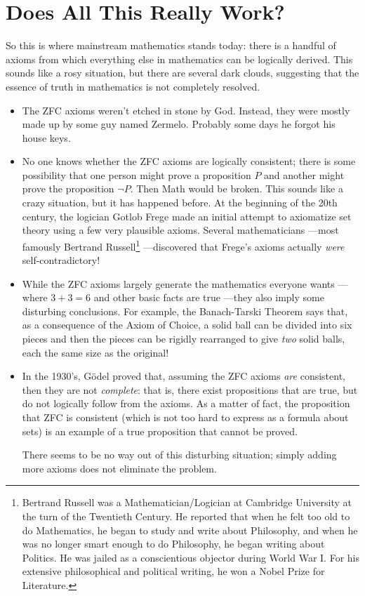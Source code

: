 \section{Does All This Really Work?}

So this is where mainstream mathematics stands today: there is a handful of
axioms from which everything else in mathematics can be logically derived.
This sounds like a rosy situation, but there are several dark clouds,
suggesting that the essence of truth in mathematics is not completely
resolved.
%
\begin{itemize}

\item The ZFC axioms weren't etched in stone by God.  Instead, they
were mostly made up by some guy named Zermelo.  Probably some days he
forgot his house keys.

\item No one knows whether the ZFC axioms are logically consistent; there
is some possibility that one person might prove a proposition $P$ and
another might prove the proposition $\neg P$.  Then Math would be broken.
This sounds like a crazy situation, but it has happened before.  At the
beginning of the 20th century, the logician Gotlob Frege made an initial
attempt to axiomatize set theory using a few very plausible axioms.
Several mathematicians ---most famously Bertrand Russell\footnote{Bertrand
Russell was a Mathematician/Logician at Cambridge University at the turn of
the Twentieth Century.
He reported that when he felt too old to do Mathematics, he began to study
and write about Philosophy, and when he was no longer smart enough to do
Philosophy, he began writing about Politics.  He was jailed as a
conscientious objector during World War I.  For his extensive
philosophical and political writing, he won a Nobel Prize for Literature.}
---discovered that Frege's axioms actually \textit{were}
self-contradictory!

\item While the ZFC axioms largely generate the mathematics everyone wants
  ---where $3 + 3 = 6$ and other basic facts are true ---they also imply
  some disturbing conclusions.  For example, the Banach-Tarski Theorem
  says that, as a consequence of the Axiom of Choice, a solid ball can be
  divided into six pieces and then the pieces can be rigidly rearranged to
  give \textit{two} solid balls, each the same size as the original!

\item In the 1930's, G\"{o}del proved that, assuming the ZFC axioms
\emph{are} consistent, then they are not \emph{complete}: that is, there
exist propositions that are true, but do not logically follow from the
axioms.  As a matter of fact, the proposition that ZFC is consistent
(which is not too hard to express as a formula about sets) is an example
of a true proposition that cannot be proved.

There seems to be no way out of this disturbing situation; simply adding
more axioms does not eliminate the problem.

\end{itemize}

